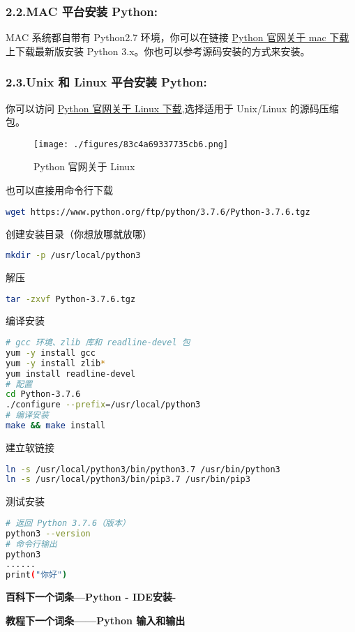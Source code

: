 \subsubsection{2.2.MAC 平台安装 Python:}
MAC 系统都自带有 Python2.7 环境，你可以在链接 \href{https://www.python.org/downloads/mac-osx/}{Python 官网关于 mac 下载} 上下载最新版安装 Python 3.x。你也可以参考源码安装的方式来安装。

\subsubsection{2.3.Unix 和 Linux 平台安装 Python:}
你可以访问 \href{https://www.python.org/downloads/source/}{Python 官网关于 Linux 下载},选择适用于 Unix/Linux 的源码压缩包。
\begin{figure}[ht]
\centering
\texttt{[image: ./figures/83c4a69337735cb6.png]}
\caption{Python 官网关于 Linux} \label{fig_Python_2}
\end{figure}

也可以直接用命令行下载
\begin{lstlisting}[language=bash]
wget https://www.python.org/ftp/python/3.7.6/Python-3.7.6.tgz
\end{lstlisting}

创建安装目录（你想放哪就放哪）
\begin{lstlisting}[language=bash]
mkdir -p /usr/local/python3
\end{lstlisting}

解压
\begin{lstlisting}[language=bash]
tar -zxvf Python-3.7.6.tgz
\end{lstlisting}

编译安装
\begin{lstlisting}[language=bash]
# gcc 环境、zlib 库和 readline-devel 包
yum -y install gcc
yum -y install zlib*
yum install readline-devel
# 配置
cd Python-3.7.6
./configure --prefix=/usr/local/python3
# 编译安装
make && make install
\end{lstlisting}

建立软链接
\begin{lstlisting}[language=bash]
ln -s /usr/local/python3/bin/python3.7 /usr/bin/python3
ln -s /usr/local/python3/bin/pip3.7 /usr/bin/pip3
\end{lstlisting}

测试安装
\begin{lstlisting}[language=bash]
# 返回 Python 3.7.6（版本）
python3 --version
# 命令行输出
python3
......
print("你好")
\end{lstlisting}

\textbf{百科下一个词条—Python - IDE安装-}

\textbf{教程下一个词条——Python 输入和输出}

